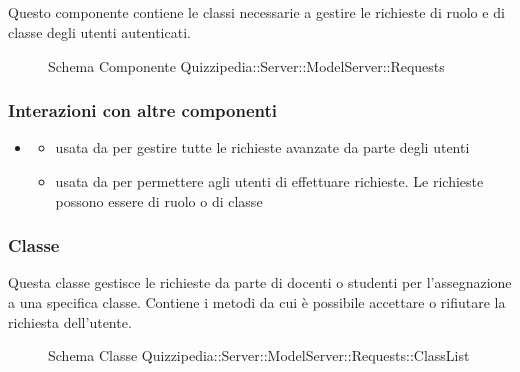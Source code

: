 \subsection{}
Questo componente contiene le classi necessarie a gestire le richieste di ruolo e di classe degli utenti autenticati.
\begin{figure}[H]
\centering
\noindent{}
\caption[Schema Componente Quizzipedia::Server::ModelServer::Requests]{Schema Componente Quizzipedia::Server::ModelServer::Requests}
\end{figure}
\subsubsection{Interazioni con altre componenti}
\begin{itemize}
\item {}
\begin{itemize}
\item usata da  per gestire tutte le richieste avanzate da parte degli utenti
\item usata da  per permettere agli utenti di effettuare richieste. Le richieste possono essere di ruolo o di classe
\end{itemize}
\end{itemize}
\subsubsection{Classe }
Questa classe gestisce le richieste da parte di docenti o studenti per l'assegnazione a una specifica classe. Contiene i metodi da cui è possibile accettare o rifiutare la richiesta dell'utente.
\begin{figure}[H]
\centering
\noindent{}
\caption[Schema Classe ClassList]{Schema Classe Quizzipedia::Server::ModelServer::Requests::ClassList}
\end{figure}
